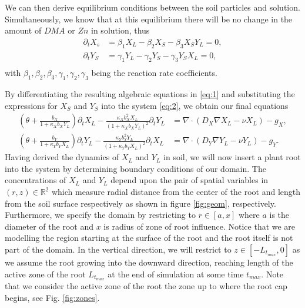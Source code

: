 \documentclass[11pt]{article}
\numberwithin{equation}{section}
\begin{document}
We can then derive equilibrium conditions between the soil particles and solution. Simultaneously, we know that at this equilibrium there will be no change in the amount of $DMA$ or $Zn$ in solution, thus
\begin{equation}
    \begin{aligned}
        \partial_t X_s&=\beta_1X_L-\beta_2X_S-\beta_3X_SY_L=0,\\
        \partial_t Y_S&=\gamma_1Y_L-\gamma_2Y_S-\gamma_3Y_SX_L=0,\\
    \end{aligned}
    \label{eq:2}
\end{equation}
with $\beta_1,\beta_2,\beta_3,\gamma_1,\gamma_2,\gamma_3$ being the reaction rate coefficients.

By differentiating the resulting algebraic equations in \eqref{eq:1} and substituting the expressions for $X_S$ and $Y_S$ into the system \eqref{eq:2}, we obtain our final equations
\begin{align}
    \left( \theta + \frac{b_X}{1 + \kappa_X b_X Y_L} \right) \partial_t X_L - \frac{\kappa_X b_X^2 X_L}{(1+\kappa_X b_X Y_L)^2} \partial_t Y_L &=
    \nabla \cdot ( D_X \nabla X_L - \nu X_L  ) - g_X,
    \label{eq:sys-Zn-X-Omega}
    \\
    \left( \theta + \frac{b_Y}{1 + \kappa_Y b_Y X_L} \right) \partial_t Y_L - \frac{\kappa_Y b_Y^2 Y_L}{(1+\kappa_Y b_Y X_L)^2} \partial_t X_L &=
    \nabla \cdot ( D_Y \nabla Y_L - \nu Y_L  ) - g_Y.
\end{align}
Having derived the dynamics of $X_L$ and $Y_L$ in soil, we will now insert a plant root into the system by determining boundary conditions of our domain.
The concentrations of $X_L$ and $Y_L$ depend upon the pair of spatial variables in $(r,z) \in \mathbb{R}^2$ which measure radial distance from the center of the root and length from the soil surface respectively as shown in figure \ref{fig:geom}, respectively. Furthermore, we specify the domain by restricting to $r \in [a,x]$ where $a$ is the diameter of the root and $x$ is radius of zone of root influence. Notice that we are modelling the region starting at the surface of the root and the root itself is not part of the domain. In the vertical direction, we will restrict to $z \in [-L_{t_{max}},0]$ as we assume the root growing into the downward direction, reaching length of the active zone of the root $L_{t_{max}}$ at the end of simulation at some time $t_{max}$. Note that we consider the active zone of the root the zone up to where the root cap begins, see Fig. \ref{fig:zones}.
\end{document}
